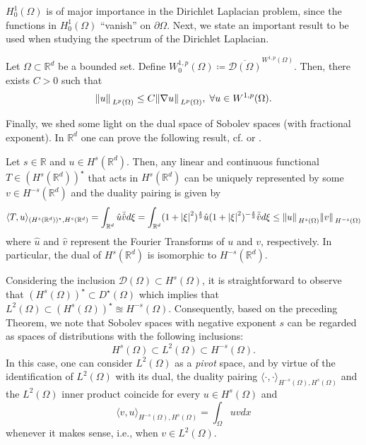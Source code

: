 \(H^1_0(\Omega)\) is of major importance in the Dirichlet Laplacian problem, since the functions in \(H^1_0(\Omega)\) ``vanish'' on \(\partial\Omega\). Next, we state an important result to be used when studying the spectrum of the Dirichlet Laplacian.
\begin{theorem}
    Let \(\Omega \subset \mathbb{R}^d\) be a bounded set. Define \(W^{1, p}_0(\Omega) \coloneqq \overline{\mathcal{D}(\Omega)}^{W^{1, p}(\Omega)}\). Then, there exists \(C > 0\) such that
    \[
        \norm*{u}_{L^p(\Omega)} \leq C \norm*{\nabla u}_{L^p(\Omega)}, \; \forall u \in W^{1, p}(\Omega).
    \]
\end{theorem}

Finally, we shed some light on the dual space of Sobolev spaces (with fractional exponent). In \(\mathbb{R}^d\) one can prove the following result, cf. \cite{chen2010boundary} or \cite{hormander2015analysis}.
\begin{theorem}
    Let \(s \in \mathbb{R}\) and \(u \in H^s(\mathbb{R}^d)\). Then, any linear and continuous functional \(T \in (H^s(\mathbb{R}^d))^\star\) that acts in \(H^s(\mathbb{R}^d)\) can be uniquely represented by some \(v \in H^{-s}(\mathbb{R}^d)\) and the duality pairing is given by
    \[
        \langle T, u \rangle_{(H^s(\mathbb{R}^d))^\star, H^s(\mathbb{R}^d)} = \int_{\mathbb{R}^d} \hat{u} \bar{\hat{v}}d \xi = \int_{\mathbb{R}^d} (1+ \abs{\xi}^2)^{\frac{s}{2}}\hat{u}(1+ \abs{\xi}^{2})^{-\frac{s}{2}}\bar{\hat{v}}d \xi \leq \norm*{u}_{H^s(\Omega)}\norm*{v}_{H^{-s}(\Omega)}
    \]
    where \(\hat{u}\) and \(\hat{v}\) represent the Fourier Transforms of \(u\) and \(v\), respectively. In particular, the dual of \(H^s(\mathbb{R}^d)\) is isomorphic to \(H^{-s}(\mathbb{R}^d)\).
\end{theorem}
\begin{remark}\label{preliminaries_chapter_duality_pairing_def_remark}
    Considering the inclusion \(\mathcal{D}(\Omega) \subset H^s(\Omega)\), it is straightforward to observe that \((H^s(\Omega))^\star \subset D^\star(\Omega)\) which implies that \(L^2(\Omega) \subset (H^{s}(\Omega))^\star \approxeq H^{-s}(\Omega)\). Consequently, based on the preceding Theorem, we note that Sobolev spaces with negative exponent \(s\) can be regarded as spaces of distributions with the following inclusions:
    \[
        H^{s}(\Omega) \subset L^2(\Omega) \subset H^{-s}(\Omega).
    \]
    In this case, one can consider \(L^2(\Omega)\) as a \textit{pivot} space, and by virtue of the identification of \(L^2(\Omega)\) with its dual, the duality pairing \(\langle \cdot, \cdot \rangle_{H^{-s}(\Omega), H^s(\Omega)}\) and the \(L^2(\Omega)\) inner product coincide for every \(u \in H^s(\Omega)\) and
    \begin{equation}\label{preliminaries_chapter_duality_pairing_def}
        \langle v, u \rangle_{H^{-s}(\Omega), H^s(\Omega)} = \int_{\Omega} u v dx
    \end{equation}
    whenever it makes sense, i.e., when \(v \in L^2(\Omega)\).
\end{remark}

